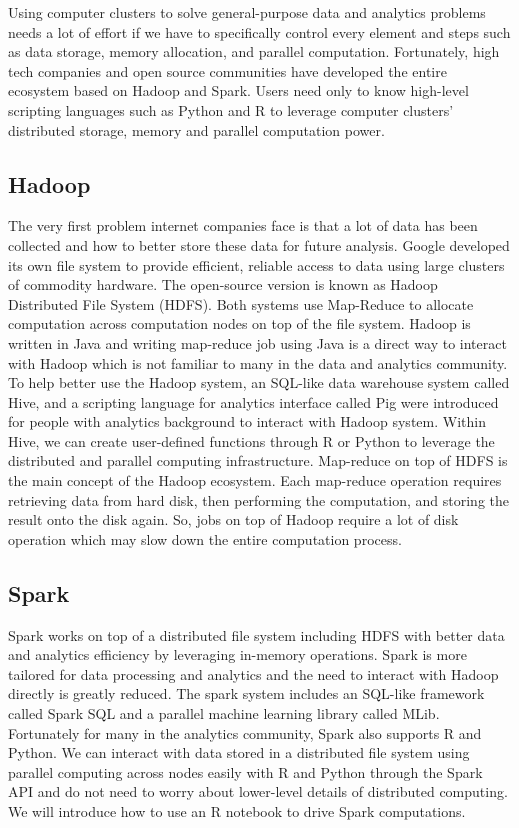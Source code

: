 \documentclass[12pt,]{krantz}
\begin{document}
Using computer clusters to solve general-purpose data and analytics problems needs a lot of effort if we have to specifically control every element and steps such as data storage, memory allocation, and parallel computation. Fortunately, high tech companies and open source communities have developed the entire ecosystem based on Hadoop and Spark. Users need only to know high-level scripting languages such as Python and R to leverage computer clusters' distributed storage, memory and parallel computation power.

\hypertarget{hadoop}{%
\subsection{Hadoop}\label{hadoop}}

The very first problem internet companies face is that a lot of data has been collected and how to better store these data for future analysis. Google developed its own file system to provide efficient, reliable access to data using large clusters of commodity hardware. The open-source version is known as Hadoop Distributed File System (HDFS). Both systems use Map-Reduce to allocate computation across computation nodes on top of the file system. Hadoop is written in Java and writing map-reduce job using Java is a direct way to interact with Hadoop which is not familiar to many in the data and analytics community. To help better use the Hadoop system, an SQL-like data warehouse system called Hive, and a scripting language for analytics interface called Pig were introduced for people with analytics background to interact with Hadoop system. Within Hive, we can create user-defined functions through R or Python to leverage the distributed and parallel computing infrastructure. Map-reduce on top of HDFS is the main concept of the Hadoop ecosystem. Each map-reduce operation requires retrieving data from hard disk, then performing the computation, and storing the result onto the disk again. So, jobs on top of Hadoop require a lot of disk operation which may slow down the entire computation process.

\hypertarget{spark}{%
\subsection{Spark}\label{spark}}

Spark works on top of a distributed file system including HDFS with better data and analytics efficiency by leveraging in-memory operations. Spark is more tailored for data processing and analytics and the need to interact with Hadoop directly is greatly reduced. The spark system includes an SQL-like framework called Spark SQL and a parallel machine learning library called MLib. Fortunately for many in the analytics community, Spark also supports R and Python. We can interact with data stored in a distributed file system using parallel computing across nodes easily with R and Python through the Spark API and do not need to worry about lower-level details of distributed computing. We will introduce how to use an R notebook to drive Spark computations.
\end{document}
